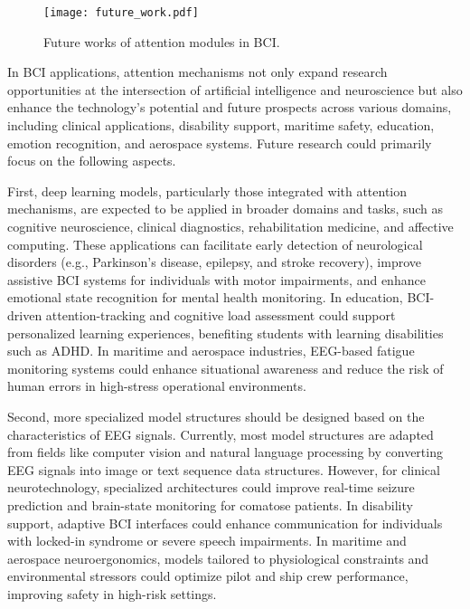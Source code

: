 \documentclass[preprint,12pt]{elsarticle}
\begin{document}
\begin{figure*}
\begin{center}
\texttt{[image: future\_work.pdf]}
\end{center}
\caption{Future works of attention modules in BCI.}
\label{fig:future_work}
\end{figure*}

In BCI applications, attention mechanisms not only expand research opportunities at the intersection of artificial intelligence and neuroscience but also enhance the technology’s potential and future prospects across various domains, including clinical applications, disability support, maritime safety, education, emotion recognition, and aerospace systems. Future research could primarily focus on the following aspects.

First, deep learning models, particularly those integrated with attention mechanisms, are expected to be applied in broader domains and tasks, such as cognitive neuroscience, clinical diagnostics, rehabilitation medicine, and affective computing. These applications can facilitate early detection of neurological disorders (e.g., Parkinson’s disease, epilepsy, and stroke recovery), improve assistive BCI systems for individuals with motor impairments, and enhance emotional state recognition for mental health monitoring. In education, BCI-driven attention-tracking and cognitive load assessment could support personalized learning experiences, benefiting students with learning disabilities such as ADHD. In maritime and aerospace industries, EEG-based fatigue monitoring systems could enhance situational awareness and reduce the risk of human errors in high-stress operational environments.

Second, more specialized model structures should be designed based on the characteristics of EEG signals. Currently, most model structures are adapted from fields like computer vision and natural language processing by converting EEG signals into image or text sequence data structures. However, for clinical neurotechnology, specialized architectures could improve real-time seizure prediction and brain-state monitoring for comatose patients. In disability support, adaptive BCI interfaces could enhance communication for individuals with locked-in syndrome or severe speech impairments. In maritime and aerospace neuroergonomics, models tailored to physiological constraints and environmental stressors could optimize pilot and ship crew performance, improving safety in high-risk settings.
\end{document}
